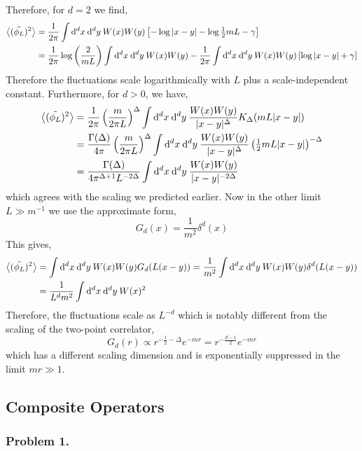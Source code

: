 \documentclass[12pt]{article}
\begin{document}
Therefore, for $d = 2$ we find,
\begin{align*}
\left< (\tilde{\phi_L})^2 \right> & = \frac{1}{2 \pi}  \int \mathrm{d}^{d} x \: \mathrm{d}^{d} y \: W(x) W(y) \left[ - \log{|x - y|} - \log{\tfrac{1}{2} mL} - \gamma \right] 
\\
& = \frac{1}{2 \pi} \log{\left(\frac{2}{m L}\right)} \int \mathrm{d}^{d} x \: \mathrm{d}^{d} y \: W(x) W(y) - \frac{1}{2 \pi} \int \mathrm{d}^{d} x \: \mathrm{d}^{d} y \: W(x) W(y) \left[ \log{|x - y|}  + \gamma \right] 
\end{align*}
Therefore the fluctuations scale logarithmically with $L$ plus a scale-independent constant. Furthermore, for $d > 0$, we have,
\begin{align*}
\left< (\tilde{\phi_L})^2 \right> & = \frac{1}{2 \pi} \left( \frac{m}{2 \pi L} \right)^{\Delta} \int \mathrm{d}^{d} x \: \mathrm{d}^{d} y \: \frac{W(x) W(y)}{|x - y|^\Delta} K_{\Delta}(m L|x - y|)
\\
& = \frac{\Gamma(\Delta)}{4 \pi} \left( \frac{m}{2 \pi L} \right)^{\Delta} \int \mathrm{d}^{d} x \: \mathrm{d}^{d} y \: \frac{W(x) W(y)}{|x - y|^\Delta} \left(\tfrac{1}{2} m L |x - y| \right)^{-\Delta} 
\\
& = \frac{\Gamma(\Delta)}{4 \pi^{\Delta + 1}L^{-2\Delta}}  \int \mathrm{d}^{d} x \: \mathrm{d}^{d} y \: \frac{W(x) W(y)}{|x - y|^{-2\Delta}} 
\end{align*}
which agrees with the scaling we predicted earlier. Now in the other limit $L \gg m^{-1}$ we use the approximate form, 
\[ G_d(x) = \frac{1}{m^2} \delta^d(x) \]
This gives,
\begin{align*}
\left< (\tilde{\phi_L})^2 \right> & =  \int \mathrm{d}^{d} x \: \mathrm{d}^{d} y \: W(x) W(y) G_d(L(x - y)) = \frac{1}{m^2} \int \mathrm{d}^{d} x \: \mathrm{d}^{d} y \: W(x) W(y) \delta^d(L(x - y))
\\
& = \frac{1}{L^d m^2} \int \mathrm{d}^{d} x \: \mathrm{d}^{d} y \: W(x)^2
\end{align*}
Therefore, the fluctuations scale as $L^{-d}$ which is notably different from the scaling of the two-point correlator,
\[ G_d(r) \propto r^{-\frac{1}{2} - \Delta} e^{-mr} = r^{-\frac{d-1}{2}} e^{-m r} \]
which has a different scaling dimension and is exponentially suppressed in the limit $mr \gg 1$. 


\subsection{Composite Operators}

\subsubsection{Problem 1.}
\end{document}
